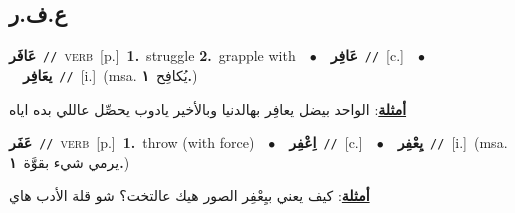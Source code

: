 \documentclass[10pt,a4paper,twoside]{article} %
\begin{document}
\begin{multicols}{2}
\vspace{-3mm}
\subsection*{\color{blue}\foreignlanguage{arabic}{ع.ف.ر}\color{blue}{}} 

{\setlength\topsep{0pt}\textbf{\foreignlanguage{arabic}{عَافَر}}\ {\color{gray}\texttt{//}\color{black}}\ \textsc{verb}\ [p.]\ \textbf{1.}~struggle  \textbf{2.}~grapple with\ \ $\bullet$\ \ \setlength\topsep{0pt}\textbf{\foreignlanguage{arabic}{عَافِر}}\ {\color{gray}\texttt{//}\color{black}}\ [c.]\ \ $\bullet$\ \ \setlength\topsep{0pt}\textbf{\foreignlanguage{arabic}{يعَافِر}}\ {\color{gray}\texttt{//}\color{black}}\ [i.]\ \color{gray}(msa. \foreignlanguage{arabic}{يُكافِح}~\foreignlanguage{arabic}{\textbf{١.}})\color{black}\  \begin{flushright}\color{gray}\foreignlanguage{arabic}{\textbf{\underline{\foreignlanguage{arabic}{أمثلة}}}: الواحد بيضل يعافِر بهالدنيا وبالأخير يادوب يحصِّل عاللي بده اياه}\end{flushright}\color{black}} \vspace{2mm}

{\setlength\topsep{0pt}\textbf{\foreignlanguage{arabic}{عَفَر}}\ {\color{gray}\texttt{//}\color{black}}\ \textsc{verb}\ [p.]\ \textbf{1.}~throw (with force)\ \ $\bullet$\ \ \setlength\topsep{0pt}\textbf{\foreignlanguage{arabic}{اِعْفِر}}\ {\color{gray}\texttt{//}\color{black}}\ [c.]\ \ $\bullet$\ \ \setlength\topsep{0pt}\textbf{\foreignlanguage{arabic}{يِعْفِر}}\ {\color{gray}\texttt{//}\color{black}}\ [i.]\ \color{gray}(msa. \foreignlanguage{arabic}{يرمي شيء بقوَّة}~\foreignlanguage{arabic}{\textbf{١.}})\color{black}\  \begin{flushright}\color{gray}\foreignlanguage{arabic}{\textbf{\underline{\foreignlanguage{arabic}{أمثلة}}}: كيف يعني بيِعْفِر الصور هيك عالتخت؟ شو قلة الأدب هاي}\end{flushright}\color{black}} \vspace{2mm}


\end{multicols}
\end{document}
